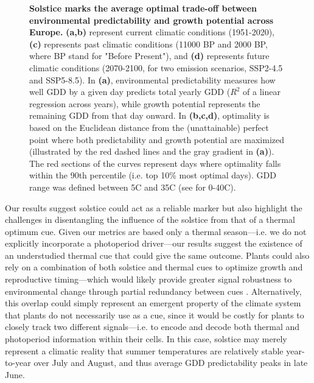 \documentclass[11pt,letter]{article}
\begin{document}
\begin{figure}[h]
	\vspace*{0.3cm}
	\caption{\textbf{Solstice marks the average optimal trade-off between environmental predictability and growth potential across Europe.} \textbf{(a,b)} represent current climatic conditions (1951-2020), \textbf{(c)} represents past climatic conditions (11000 BP and 2000 BP, where BP stand for "Before Present"), and \textbf{(d)} represents future climatic conditions (2070-2100, for two emission scenarios, SSP2-4.5 and SSP5-8.5). In \textbf{(a)}, environmental predictability measures how well GDD by a given day predicts total yearly GDD ($R^2$ of a linear regression across years), while growth potential represents the remaining GDD from that day onward. In \textbf{(b,c,d)}, optimality is based on the Euclidean distance from the (unattainable) perfect point where both predictability and growth potential are maximized (illustrated by the red dashed lines and the gray gradient in \textbf{(a)}). The red sections of the curves represent days where optimality falls within the 90th percentile (i.e. top 10\% most optimal days). GDD range was defined between 5\degree C and 35\degree C (see  for 0-40\degree C).} 
	\label{fig:globaloptimality}
\end{figure}

Our results suggest solstice could act as a reliable marker but also highlight the challenges in disentangling the influence of the solstice from that of a thermal optimum cue. Given our metrics are based only a thermal season---i.e. we do not explicitly incorporate a photoperiod driver---our results suggest the existence of an understudied thermal cue that could give the same outcome.
Plants could also rely on a combination of both solstice and thermal cues to optimize growth and reproductive timing---which would likely provide greater signal robustness to environmental change through partial redundancy between cues \citep{Bonamour2019}.
Alternatively, this overlap could simply represent an emergent property of the climate system that plants do not necessarily use as a cue, since it would be costly for plants to closely track two different signals---i.e. to encode and decode both thermal and photoperiod information within their cells. In this case, solstice may merely represent a climatic reality that summer temperatures are relatively stable year-to-year over July and August, and thus average GDD predictability peaks in late June. 
\end{document}
